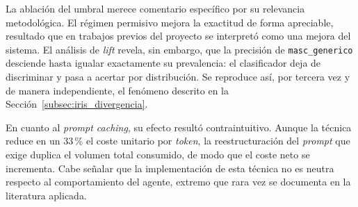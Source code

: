 \begin{table}[H]
    \centering
    \begingroup
    \small
    \endgroup
\end{table}

La ablación del umbral merece comentario específico por su relevancia
metodológica. El régimen permisivo mejora la exactitud de forma apreciable,
resultado que en trabajos previos del proyecto se interpretó como una mejora
del sistema. El análisis de \textit{lift} revela, sin embargo, que la
precisión de \texttt{masc\_generico} desciende hasta igualar exactamente su
prevalencia: el clasificador deja de discriminar y pasa a acertar por
distribución. Se reproduce así, por tercera vez y de manera independiente, el
fenómeno descrito en la Sección~\ref{subsec:iris_divergencia}.

En cuanto al \textit{prompt caching}, su efecto resultó contraintuitivo. Aunque
la técnica reduce en un 33\,\% el coste unitario por \textit{token}, la
reestructuración del \textit{prompt} que exige duplica el volumen total
consumido, de modo que el coste neto se incrementa. Cabe señalar que la
implementación de esta técnica no es neutra respecto al comportamiento del
agente, extremo que rara vez se documenta en la literatura aplicada.

